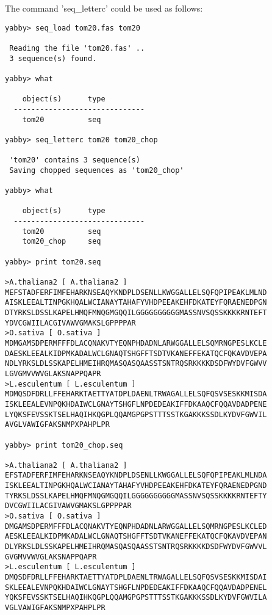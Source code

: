 The command 'seq\_letterc' could be used as follows:

\begin{verbatim}
yabby> seq_load tom20.fas tom20

 Reading the file 'tom20.fas' ..
 3 sequence(s) found.

yabby> what      

    object(s)      type
  ------------------------------
    tom20          seq           

yabby> seq_letterc tom20 tom20_chop

 'tom20' contains 3 sequence(s)
 Saving chopped sequences as 'tom20_chop'

yabby> what

    object(s)      type
  ------------------------------
    tom20          seq           
    tom20_chop     seq           

yabby> print tom20.seq

>A.thaliana2 [ A.thaliana2 ]
MEFSTADFERFIMFEHARKNSEAQYKNDPLDSENLLKWGGALLELSQFQPIPEAKLMLND
AISKLEEALTINPGKHQALWCIANAYTAHAFYVHDPEEAKEHFDKATEYFQRAENEDPGN
DTYRKSLDSSLKAPELHMQFMNQGMGQQILGGGGGGGGGGMASSNVSQSSKKKKRNTEFT
YDVCGWIILACGIVAWVGMAKSLGPPPPAR
>O.sativa [ O.sativa ]
MDMGAMSDPERMFFFDLACQNAKVTYEQNPHDADNLARWGGALLELSQMRNGPESLKCLE
DAESKLEEALKIDPMKADALWCLGNAQTSHGFFTSDTVKANEFFEKATQCFQKAVDVEPA
NDLYRKSLDLSSKAPELHMEIHRQMASQASQAASSTSNTRQSRKKKKDSDFWYDVFGWVV
LGVGMVVWVGLAKSNAPPQAPR
>L.esculentum [ L.esculentum ]
MDMQSDFDRLLFFEHARKTAETTYATDPLDAENLTRWAGALLELSQFQSVSESKKMISDA
ISKLEEALEVNPQKHDAIWCLGNAYTSHGFLNPDEDEAKIFFDKAAQCFQQAVDADPENE
LYQKSFEVSSKTSELHAQIHKQGPLQQAMGPGPSTTTSSTKGAKKKSSDLKYDVFGWVIL
AVGLVAWIGFAKSNMPXPAHPLPR

yabby> print tom20_chop.seq

>A.thaliana2 [ A.thaliana2 ]
EFSTADFERFIMFEHARKNSEAQYKNDPLDSENLLKWGGALLELSQFQPIPEAKLMLNDA
ISKLEEALTINPGKHQALWCIANAYTAHAFYVHDPEEAKEHFDKATEYFQRAENEDPGND
TYRKSLDSSLKAPELHMQFMNQGMGQQILGGGGGGGGGGMASSNVSQSSKKKKRNTEFTY
DVCGWIILACGIVAWVGMAKSLGPPPPAR
>O.sativa [ O.sativa ]
DMGAMSDPERMFFFDLACQNAKVTYEQNPHDADNLARWGGALLELSQMRNGPESLKCLED
AESKLEEALKIDPMKADALWCLGNAQTSHGFFTSDTVKANEFFEKATQCFQKAVDVEPAN
DLYRKSLDLSSKAPELHMEIHRQMASQASQAASSTSNTRQSRKKKKDSDFWYDVFGWVVL
GVGMVVWVGLAKSNAPPQAPR
>L.esculentum [ L.esculentum ]
DMQSDFDRLLFFEHARKTAETTYATDPLDAENLTRWAGALLELSQFQSVSESKKMISDAI
SKLEEALEVNPQKHDAIWCLGNAYTSHGFLNPDEDEAKIFFDKAAQCFQQAVDADPENEL
YQKSFEVSSKTSELHAQIHKQGPLQQAMGPGPSTTTSSTKGAKKKSSDLKYDVFGWVILA
VGLVAWIGFAKSNMPXPAHPLPR
\end{verbatim}

